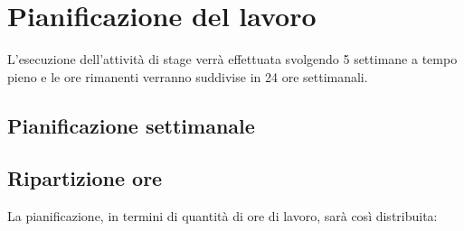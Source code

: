 
\section*{Pianificazione del lavoro}

L'esecuzione dell'attività di stage verrà effettuata svolgendo 5 settimane a tempo pieno e le ore rimanenti verranno suddivise in 24 ore settimanali.

\subsection*{Pianificazione settimanale}
\prospettoSettimanale

\newpage

\subsection*{Ripartizione ore}

La pianificazione, in termini di quantità di ore di lavoro, sarà così distribuita:

\begin{center}
    
\end{center}

\newpage